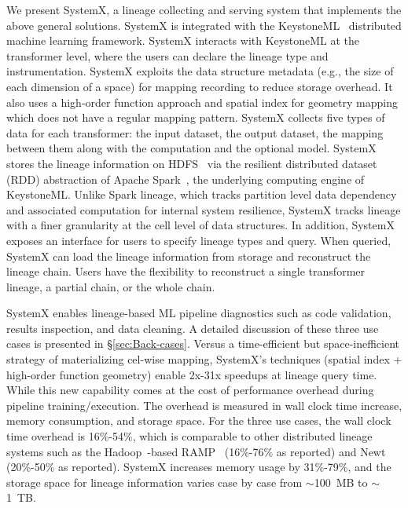 \documentclass{sig-alternate}
\begin{document}
We present SystemX, a lineage collecting and serving system that implements the above general solutions.
SystemX is integrated with the KeystoneML~\cite{sparks15} distributed machine learning framework.
SystemX interacts with KeystoneML at the transformer level, where the users can declare the lineage type and instrumentation.
SystemX exploits the  data structure metadata (e.g., the size of each dimension of a space) for mapping recording to reduce storage overhead.
It also uses a high-order function approach and spatial index for geometry mapping which does not have a regular mapping pattern.
SystemX collects five types of data for each transformer: the input dataset, the output dataset, the mapping between them
along with the computation and the optional model.
SystemX stores the lineage information on HDFS~\cite{shvachko10} via the resilient distributed dataset (RDD) abstraction
of Apache Spark~\cite{zaharia12}, the underlying computing engine of KeystoneML.
Unlike Spark lineage, which tracks partition level data dependency and associated computation for internal system resilience,
SystemX tracks lineage with a finer granularity at the cell level of data structures.
In addition, SystemX exposes an interface for users to specify lineage types and query.
When queried, SystemX can load the lineage information from storage and reconstruct the lineage chain.
Users have the flexibility to reconstruct a single transformer lineage, a partial chain, or the whole chain.

SystemX enables lineage-based ML pipeline diagnostics such as code validation, results inspection, and data cleaning.
A detailed discussion of these three use cases is presented in \S\ref{sec:Back-cases}.
Versus a time-efficient but space-inefficient strategy of materializing cel-wise mapping, 
SystemX's techniques (spatial index + high-order function geometry) enable 2x-31x speedups at lineage query time.
While this new capability comes at the cost of performance overhead during pipeline training/execution.
The overhead is measured in wall clock time increase, memory consumption, and storage space.
For the three use cases, the wall clock time overhead is 16\%-54\%, which is comparable to other distributed lineage systems
such as the Hadoop~\cite{HADOOP}-based RAMP~\cite{ikeda11, park11} (16\%-76\% as reported)  and Newt~\cite{logothetis13} (20\%-50\% as reported).
SystemX increases memory usage by 31\%-79\%,
and the storage space for lineage information varies case by case from $\sim$100~MB to $\sim$1~TB.
\end{document}
